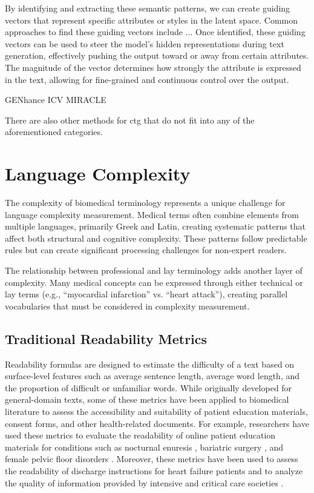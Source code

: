 By identifying and extracting these semantic patterns, we can create guiding vectors that represent specific attributes or styles in the latent space.
Common approaches to find these guiding vectors include ...
Once identified, these guiding vectors can be used to steer the model's hidden representations during text generation, effectively pushing the output toward or away from certain attributes.
The magnitude of the vector determines how strongly the attribute is expressed in the text, allowing for fine-grained and continuous control over the output.

GENhance
ICV
MIRACLE

There are also other methods for \gls{ctg} that do not fit into any of the aforementioned categories.

\section{Language Complexity}
\label{c2:s:linguistic-complexity}

The complexity of biomedical terminology represents a unique challenge for language complexity measurement. 
Medical terms often combine elements from multiple languages, primarily Greek and Latin, creating systematic patterns that affect both structural and cognitive complexity. 
These patterns follow predictable rules but can create significant processing challenges for non-expert readers.

The relationship between professional and lay terminology adds another layer of complexity. 
Many medical concepts can be expressed through either technical or lay terms (e.g., ``myocardial infarction'' vs. ``heart attack''), creating parallel vocabularies that must be considered in complexity measurement. 

\subsection{Traditional Readability Metrics}

Readability formulas are designed to estimate the difficulty of a text based on surface-level features such as average sentence length, average word length, and the proportion of difficult or unfamiliar words. While originally developed for general-domain texts, some of these metrics have been applied to biomedical literature to assess the accessibility and suitability of patient education materials, consent forms, and other health-related documents. For example, researchers have used these metrics to evaluate the readability of online patient education materials for conditions such as nocturnal enuresis \cite{Fung2024-uh}, bariatric surgery \cite{Lucy2023-zi}, and female pelvic floor disorders \cite{Varli2023-ma}. Moreover, these metrics have been used to assess the readability of discharge instructions for heart failure patients \cite{Tuan2023-wc} and to analyze the quality of information provided by intensive and critical care societies \cite{Hanci2024-wv}.

